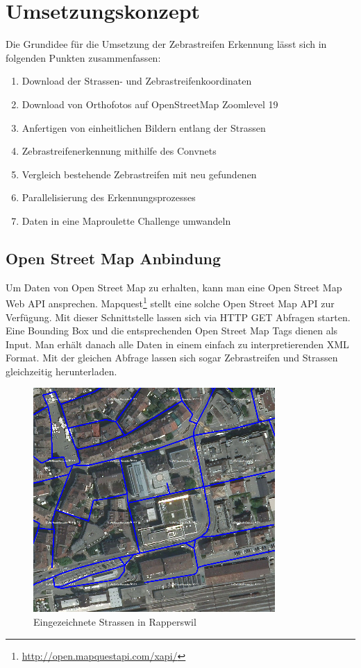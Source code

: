 \section{Umsetzungskonzept}
Die Grundidee für die Umsetzung der Zebrastreifen Erkennung lässt sich in folgenden Punkten zusammenfassen:
\begin{enumerate}
	\item Download der Strassen- und Zebrastreifenkoordinaten
	\item Download von Orthofotos auf OpenStreetMap Zoomlevel 19
	\item Anfertigen von einheitlichen Bildern entlang der Strassen
	\item Zebrastreifenerkennung mithilfe des Convnets
	\item Vergleich bestehende Zebrastreifen mit neu gefundenen
	\item Parallelisierung des Erkennungsprozesses
	\item Daten in eine Maproulette Challenge umwandeln
\end{enumerate}

\subsection{Open Street Map Anbindung}
Um Daten von Open Street Map zu erhalten, kann man eine Open Street Map Web API ansprechen. Mapquest\footnote{\url{http://open.mapquestapi.com/xapi/}} stellt eine solche Open Street Map API zur Verfügung. Mit dieser Schnittstelle lassen sich via HTTP GET Abfragen starten. Eine Bounding Box und die entsprechenden Open Street Map Tags dienen als Input. Man erhält danach alle Daten in einem einfach zu interpretierenden XML Format. Mit der gleichen Abfrage lassen sich sogar Zebrastreifen und Strassen gleichzeitig herunterladen.

\begin{figure}[H]
	\centering
	\includegraphics{images/Strassen_Rapperswil.png}
	\caption{Eingezeichnete Strassen in Rapperswil}
\end{figure}

